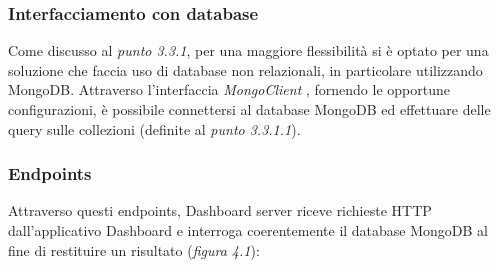 \subsubsection{Interfacciamento con database}
Come discusso al \emph{punto 3.3.1}, per una maggiore flessibilità si è optato per una soluzione che faccia uso di database non relazionali, in particolare utilizzando MongoDB.\newline
Attraverso l'interfaccia \emph{MongoClient} \cite{MongoClient}, fornendo le opportune configurazioni, è possibile connettersi al database MongoDB ed effettuare delle query sulle collezioni (definite al \emph{punto 3.3.1.1}).
\vspace{20mm}
\subsubsection{Endpoints}
Attraverso questi endpoints, Dashboard server riceve richieste HTTP dall'applicativo Dashboard e interroga coerentemente il database MongoDB al fine di restituire un risultato (\emph{figura 4.1}):
\vspace{8mm}
